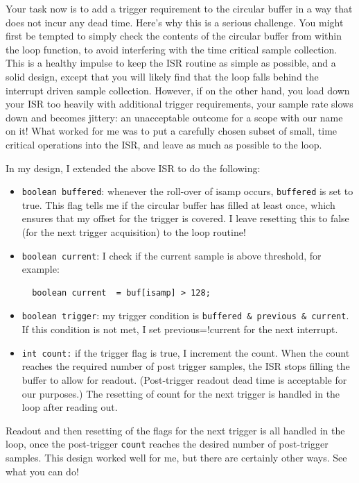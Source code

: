 \documentclass[12pt]{article}
\begin{document}
Your task now is to add a trigger requirement to the circular buffer in a way that does not incur any dead time.  Here's why this is a serious challenge.  You might first be tempted to simply check the contents of the circular buffer from within the loop function, to avoid interfering with the time critical sample collection.  This is a healthy impulse to keep the ISR routine as simple as possible, and a solid design, except that you will likely find that the loop falls behind the interrupt driven sample collection.  However, if on the other hand, you load down your ISR too heavily with additional trigger requirements, your sample rate slows down and becomes jittery:  an unacceptable outcome for a scope with our name on it!  What worked for me was to put a carefully chosen subset of small, time critical operations into the ISR, and leave as much as possible to the loop.

In my design, I extended the above ISR to do the following:
\begin{itemize}
\item {\tt boolean buffered}:  whenever the roll-over of isamp occurs, {\tt buffered} is set to true.   This flag tells me if the circular buffer has filled at least once, which ensures that my offset for the trigger is covered.
I leave resetting this to false (for the next trigger acquisition) to the loop routine!
\item {\tt boolean current}:  I check if the current sample is above threshold, for example:
\begin{verbatim}
  boolean current  = buf[isamp] > 128;
\end{verbatim} 
\item {\tt boolean trigger}: my trigger condition is  {\tt buffered \& previous \& current}.  If this condition is not met, I set previous=!current for the next interrupt.
\item {\tt int count:}  if the trigger flag is true, I increment the count.  When the count reaches the required number of post trigger samples, the ISR stops filling the buffer to allow for readout.  (Post-trigger readout dead time is acceptable for our purposes.)  The resetting of count for the next trigger is handled in the loop after reading out.
\end{itemize} 
Readout and then resetting of the flags for the next trigger is all handled in the loop, once the post-trigger {\tt count} reaches the desired number of post-trigger samples.  This design worked well for me, but there are certainly other ways.  See what you can do!
\end{document}
